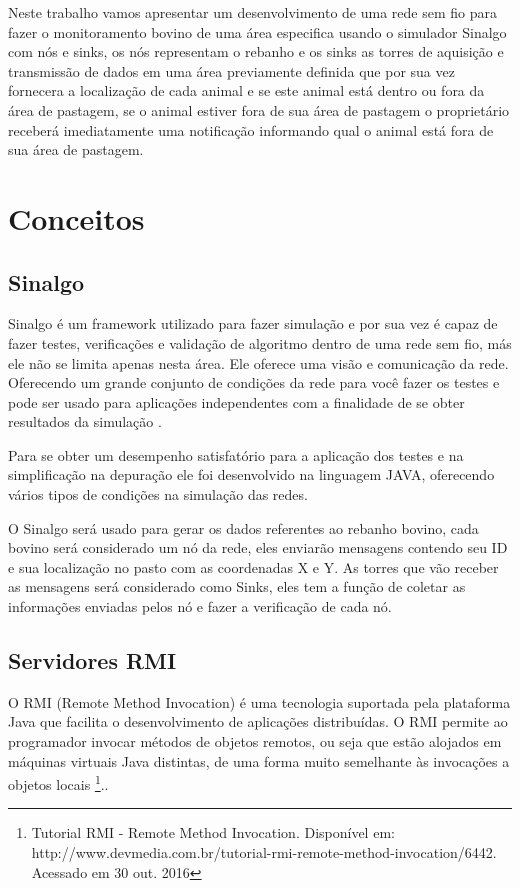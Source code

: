 \documentclass[12pt]{article}
\begin{document}
Neste trabalho vamos apresentar um desenvolvimento de uma rede sem fio para fazer o monitoramento bovino de uma área especifica usando o simulador Sinalgo com nós e sinks, os nós representam o rebanho e os sinks as torres de aquisição e transmissão de dados em uma área previamente definida que por sua vez fornecera a localização de cada animal e se este animal está dentro ou fora da área de pastagem, se o animal estiver fora de sua área de pastagem o proprietário receberá imediatamente uma notificação informando qual o animal está fora de sua área de pastagem.


\section{Conceitos}

    \subsection{Sinalgo}
	Sinalgo é um framework utilizado para fazer simulação e por sua vez é capaz de fazer testes, verificações e validação de algoritmo dentro de uma rede sem fio, más ele não se limita apenas nesta área. Ele oferece uma visão e comunicação da rede. Oferecendo um grande conjunto de condições da rede para você fazer os testes e pode ser usado para aplicações independentes com a finalidade de se obter resultados da simulação \cite{cavalcanteestendendo}.
	
	Para se obter um desempenho satisfatório para a aplicação dos testes e na simplificação na depuração ele foi desenvolvido na linguagem JAVA, oferecendo vários tipos de condições na simulação das redes.
	
	O Sinalgo será usado para gerar os dados referentes ao rebanho bovino, cada bovino será considerado um nó da rede, eles enviarão mensagens contendo seu ID e sua localização no pasto com as coordenadas X e Y. As torres que vão receber as mensagens será considerado como Sinks, eles tem a função de coletar as informações enviadas pelos nó e fazer a verificação de cada nó.
	
	\subsection{Servidores RMI}
	O RMI (Remote Method Invocation) é uma tecnologia suportada pela plataforma Java que facilita o desenvolvimento de aplicações distribuídas. O RMI permite ao programador invocar métodos de objetos remotos, ou seja que estão alojados em máquinas virtuais Java distintas, de uma forma muito semelhante às invocações a objetos locais \footnote{Tutorial RMI - Remote Method Invocation. Disponível em: http://www.devmedia.com.br/tutorial-rmi-remote-method-invocation/6442. Acessado em 30 out. 2016}.. 
\end{document}
